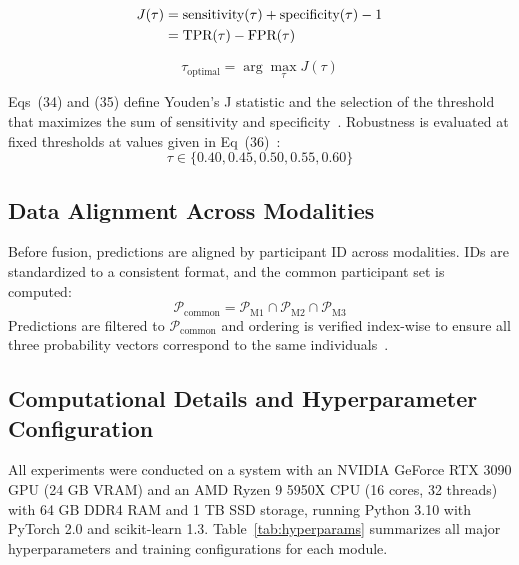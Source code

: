 \documentclass[10pt,letterpaper]{article}
\begin{document}
\begin{align}
J(\tau) &= \text{sensitivity}(\tau) + \text{specificity}(\tau) - 1 \\
        &= \text{TPR}(\tau) - \text{FPR}(\tau) \notag
\end{align}

\begin{equation}
\tau_{\text{optimal}} = \arg\max_{\tau} J(\tau)
\end{equation}

Eqs~(34) and (35) define Youden's J statistic and the selection of the threshold that maximizes the sum of sensitivity and specificity~\cite{ref61}. Robustness is evaluated at fixed thresholds at values given in Eq~(36)~\cite{ref60}:
\begin{equation}
\tau \in \{0.40,0.45,0.50,0.55,0.60\}
\end{equation}

\subsection*{Data Alignment Across Modalities}
Before fusion, predictions are aligned by participant ID across modalities. IDs are standardized to a consistent format, and the common participant set is computed:
\begin{equation}
\mathcal{P}_{\text{common}}=\mathcal{P}_{\text{M1}}\cap \mathcal{P}_{\text{M2}}\cap \mathcal{P}_{\text{M3}}
\end{equation}
Predictions are filtered to $\mathcal{P}_{\text{common}}$ and ordering is verified index-wise to ensure all three probability vectors correspond to the same individuals~\cite{ref57}.

\subsection*{Computational Details and Hyperparameter Configuration}

All experiments were conducted on a system with an NVIDIA GeForce RTX 3090 GPU (24 GB VRAM) and an AMD Ryzen 9 5950X CPU (16 cores, 32 threads) with 64 GB DDR4 RAM and 1 TB SSD storage, running Python 3.10 with PyTorch 2.0 and scikit-learn 1.3. Table~\ref{tab:hyperparams} summarizes all major hyperparameters and training configurations for each module.
\end{document}
